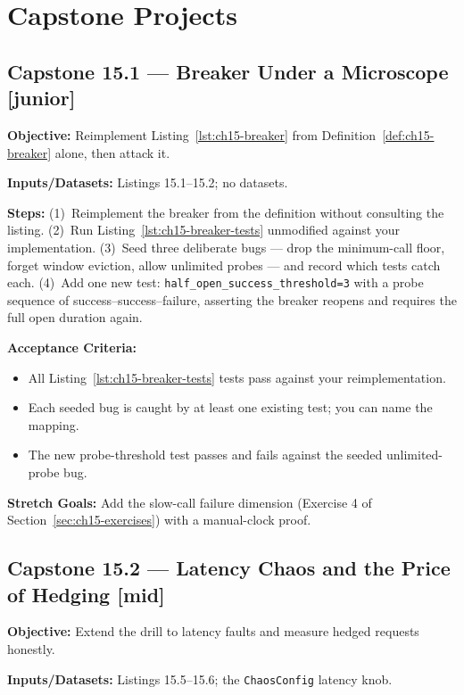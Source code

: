 \section{Capstone Projects}
\label{sec:ch15-capstones}

\subsection*{Capstone 15.1 --- Breaker Under a Microscope \hfill [junior]}
\textbf{Objective:} Reimplement Listing~\ref{lst:ch15-breaker} from
Definition~\ref{def:ch15-breaker} alone, then attack it.

\textbf{Inputs/Datasets:} Listings 15.1--15.2; no datasets.

\textbf{Steps:} (1)~Reimplement the breaker from the definition without
consulting the listing. (2)~Run Listing~\ref{lst:ch15-breaker-tests}
unmodified against your implementation. (3)~Seed three deliberate bugs ---
drop the minimum-call floor, forget window eviction, allow unlimited
probes --- and record which tests catch each. (4)~Add one new test:
\texttt{half\_open\_success\_threshold=3} with a probe sequence of
success--success--failure, asserting the breaker reopens and requires the
full open duration again.

\textbf{Acceptance Criteria:}
\begin{itemize}
  \item[$\square$] All Listing~\ref{lst:ch15-breaker-tests} tests pass
        against your reimplementation.
  \item[$\square$] Each seeded bug is caught by at least one existing test;
        you can name the mapping.
  \item[$\square$] The new probe-threshold test passes and fails against
        the seeded unlimited-probe bug.
\end{itemize}

\textbf{Stretch Goals:} Add the slow-call failure dimension (Exercise 4 of
Section~\ref{sec:ch15-exercises}) with a manual-clock proof.

\subsection*{Capstone 15.2 --- Latency Chaos and the Price of Hedging \hfill [mid]}
\textbf{Objective:} Extend the drill to latency faults and measure hedged
requests honestly.

\textbf{Inputs/Datasets:} Listings 15.5--15.6; the \texttt{ChaosConfig}
latency knob.

